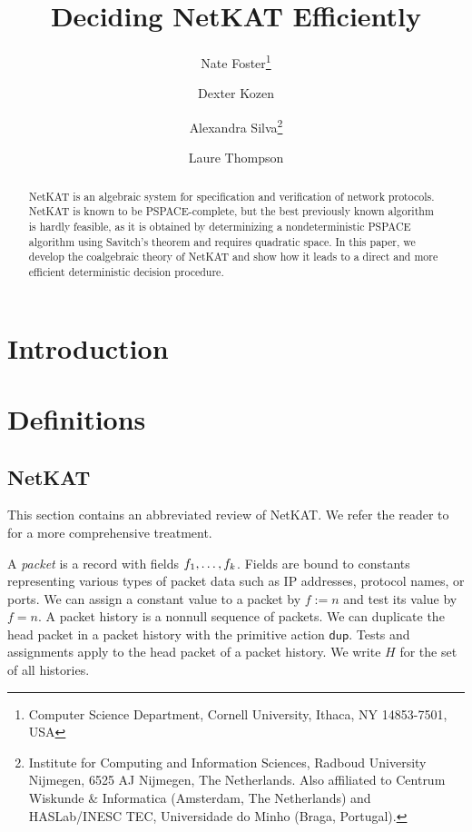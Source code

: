 \documentclass{article}
\newcommand{\netkat}{NetKAT\xspace}
\newcommand\Hist{H}
\newcommand{\kw}[1]{\ensuremath{\mathsf{#1}}}
\newcommand{\pdup}{\ensuremath{\mathrel{\kw{dup}}}}
\begin{document}
\title{Deciding \netkat Efficiently}
\author{\hspace{2cm}Nate Foster\footnote{Computer Science Department, Cornell University, Ithaca, NY 14853-7501, USA}
\and
Dexter Kozen\footnotemark[1]\hspace{2cm}
\and
\hspace{2cm}Alexandra Silva\footnote{Institute for Computing and Information Sciences, Radboud University Nijmegen, 6525 AJ Nijmegen, The Netherlands. Also affiliated to Centrum Wiskunde \& Informatica (Amsterdam, The Netherlands) and HASLab/INESC TEC, Universidade do Minho (Braga, Portugal).}
\and
Laure Thompson\footnotemark[1]\hspace{2cm}
}

\maketitle

\begin{abstract}
\netkat is an algebraic system for specification and verification of network protocols. \netkat is known to be PSPACE-complete, but the best previously known algorithm is hardly feasible, as it is obtained by determinizing a nondeterministic PSPACE algorithm using Savitch's theorem and requires quadratic space. In this paper, we develop the coalgebraic theory of \netkat and show how it leads to a direct and more efficient deterministic decision procedure.
\end{abstract}

\section{Introduction}
\label{sec:intro}

\section{Definitions}
\label{sec:defs}

\subsection{\netkat}
\label{sec:netkat}

This section contains an abbreviated review of \netkat.
We refer the reader to \cite{AFGJKSW13a} for a more comprehensive treatment.

A \emph{packet} is a record with fields $f_{1},\ldots,f_{k}$. Fields are bound to
constants representing various types of packet data such as IP
addresses, protocol names, or ports.
We can assign a constant value to a packet by $f := n$ and test its
value by $f=n$. A packet history is a nonnull sequence of packets.
We can duplicate the head packet in a packet history with the primitive action $\pdup$.
Tests and assignments apply to the head packet of a packet history.
We write $\Hist$ for the set of all histories.
\end{document}
